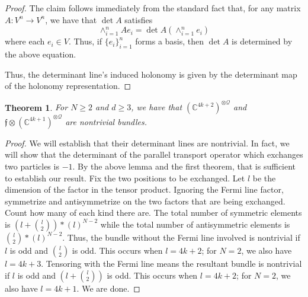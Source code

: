 \documentclass[11pt]{article}
\newtheorem{theorem}{Theorem}
\theoremstyle{remark}
\begin{document}
\begin{proof}
The claim follows immediately
from the standard fact  that, for any matrix $A:V^n \to V^n$, we have
that $\det A$ satisfies 
\[ 
\mathop{\wedge}_{i=1}^n A e_i = \det A (\mathop{\wedge}_{i=1}^n e_i)
\]
where each $e_i \in V$. Thus, if $\{e_i\}_{i=1}^n$
forms a basis, then $\det A$ is determined by the above equation. 


Thus, the determinant line's induced holonomy is
given by the determinant map of the holonomy representation.  
\end{proof} 

\begin{theorem}
 For $N \geq 2$ and $\ensuremath{d} \geq 3$, we have that $(\ensuremath{\mathbb{C}}^{4k +2})^{\otimes
 \ensuremath{\mathcal{Q}}}$ and $\ensuremath{\mathfrak{f}} \otimes (\ensuremath{\mathbb{C}}^{4k +1})^{\otimes
 \ensuremath{\mathcal{Q}}}$ are nontrivial bundles.
 

\end{theorem}  

\begin{proof}
We will establish that their determinant lines are nontrivial. In
fact, we will show that the determinant of the parallel transport
operator which exchanges two particles is $-1$. By the above lemma and
the first theorem, 
that is sufficient to establish our result. Fix the two positions to
be exchanged. Let $l$ be the dimension of the factor in the tensor
product. Ignoring the Fermi line factor, 
symmetrize and antisymmetrize on the two factors that
are being exchanged. Count how many of each kind there are. The
total number of symmetric elements is $(l +
\binom{l}{2})*(l)^{N-2}$ while the total number of antisymmetric
elements is $\binom{l}{2}*(l)^{N-2}$. Thus, the bundle without the
Fermi line involved is
nontrivial if $l$ is odd and $\binom{l}{2}$ is
odd. This occurs when $l = 4k+2$; for $N=2$, we also have $l = 4k+3$. 
Tensoring with the Fermi line 
means the resultant bundle is nontrivial
if $l$ is odd and $(l +
\binom{l}{2})$  is odd. This occurs when $l = 4k+2$; for
$N=2$, we also have $l= 4k+1$. 
We are done.
\end{proof}

\clearpage


\end{document}
